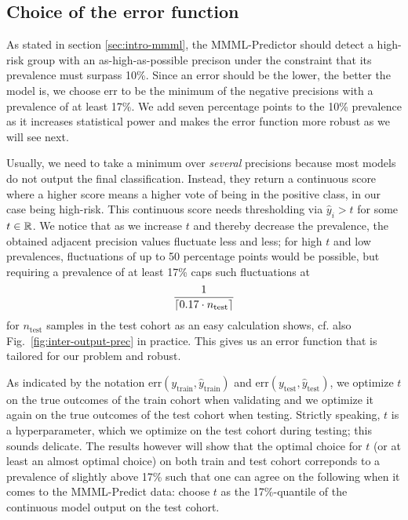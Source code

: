 \subsection{Choice of the error function}\label{sec:error-function}

As stated in section \ref{sec:intro-mmml}, the MMML-Predictor should detect a high-risk group 
with an as-high-as-possible precison under the constraint that its prevalence must surpass 
\num{10}\%. Since an error should be the lower, the better the model is, we choose 
$\text{err}$ to be the minimum of the negative precisions with a prevalence of at least 17\%. We 
add seven percentage points to the \num{10}\% prevalence as it increases statistical power and makes 
the error function more robust as we will see next. 

Usually, we need 
to take a minimum over \textit{several} precisions because most models do not output the final 
classification.
Instead, they return a continuous score where a higher score means a higher vote of being
in the positive class, in our case being high-risk. This continuous score needs thresholding
via $\hat{y}_i > t$ for some $t \in \RR$.
We notice that as we increase $t$ and thereby decrease the prevalence, the obtained 
adjacent precision values fluctuate less and less; for high $t$ and low 
prevalences, fluctuations of up to \num{50} percentage points would be possible, but requiring a 
prevalence of at least 17\% caps such fluctuations at 
\begin{align}
    \frac{1}{\ceil*{\num{0.17} \cdot n_\text{test}}}
\end{align}
for $n_\text{test}$ samples in the test cohort as an easy calculation shows, cf. also Fig.\ 
\ref{fig:inter-output-prec} in practice. This gives us an error function that is tailored 
for our problem and robust.

As indicated by the notation $\text{err}(y_\text{train}, \hat{y}_\text{train})$ and 
$\text{err}(y_\text{test}, \hat{y}_\text{test})$, we optimize $t$ on the true outcomes 
of the train cohort when validating and we optimize it again on the true outcomes of the test cohort 
when testing. Strictly speaking, $t$ is a hyperparameter, which we optimize on the 
test cohort during testing; this sounds delicate. The results however will show that the optimal 
choice for $t$ (or at least an 
almost optimal choice) on both train and test cohort correponds to a prevalence of 
slightly above 17\% such that one can agree on the following when it comes to the MMML-Predict data: 
choose $t$ as the 17\%-quantile of the continuous model output on the test cohort.

